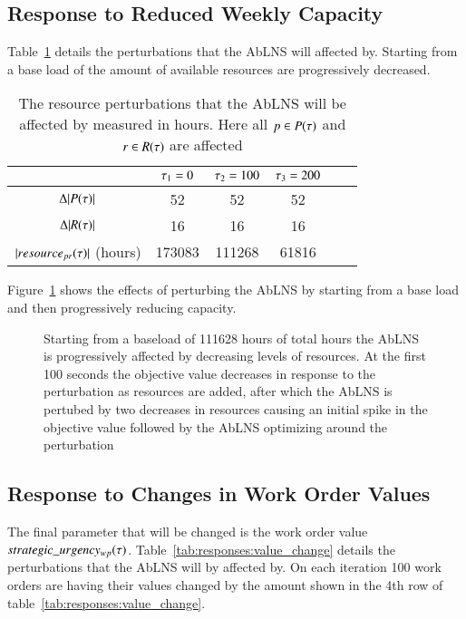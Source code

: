 \subsection{Response to Reduced Weekly Capacity}\label{sec:results:reduced_weekly_capacity}
Table~\ref{tab:resources:resource-subtraction} details the perturbations that the
AbLNS will affected by. Starting from a base load of the amount of available
resources are progressively decreased.
\begin{table}[H]
	\centering
	\begin{tabular}{cccccc}
	\toprule
	                                    & $\tau_1 = 0$ & $\tau_2 = 100$ & $\tau_3 = 200$ \\ \midrule
	$\Delta |P(\tau)|$               & 52                     & 52                     & 52                   \\ \midrule
	$\Delta |R(\tau)|$             & 16                     & 16                     & 16                   \\ \midrule
	$ |resource_{pr}(\tau)|$ (hours)& 173083                 & 111268                 & 61816                \\ \bottomrule
	\end{tabular}
	\caption{The resource perturbations that the AbLNS will be affected by measured in hours. Here all $p \in P(\tau)$ and $r \in R(\tau)$ are 
		affected}\label{tab:resources:resource-subtraction}
\end{table}

Figure~\ref{fig:responses:resource-subtraction} shows the effects of perturbing
the AbLNS by starting from a base load  and then progressively reducing
capacity.

\begin{figure}[H]%
	\centering
	\resizebox{10cm}{!}{
		
	}
	\caption{Starting from a baseload of 111628 hours of total hours the AbLNS is 
	progressively affected by decreasing levels of resources. At the first 
	100 seconds the objective value decreases in response to the perturbation
	as resources are added, after which the AbLNS is pertubed by two decreases
	in resources causing an initial spike in the objective value followed 
	by the AbLNS optimizing around the perturbation
	}\label{fig:responses:resource-subtraction}
\end{figure}

\subsection{Response to Changes in Work Order Values}\label{sec:results:strategic_value_changes}
The final parameter that will be changed is the work order value $
strategic\_urgency_{w p}(\tau)$. Table~\ref{tab:responses:value_change} details the
perturbations that the AbLNS will by affected by. On each iteration 100 work
orders are having their values changed by the amount  shown in the 4th row of
table~\ref{tab:responses:value_change}.

